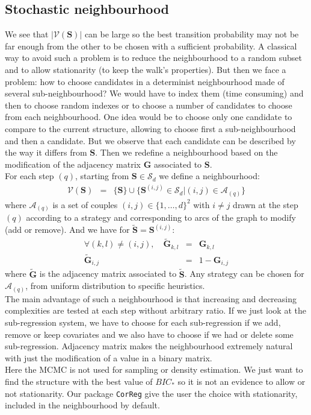 \documentclass[12pt,a4paper]{report}
\begin{document}
	\subsection{Stochastic neighbourhood}
	We see that $|\mathcal{V}(\boldsymbol{S})|$ can be large so the best transition probability may not be far enough from the other to be chosen with a sufficient probability. A classical way to avoid such a problem is to reduce the neighbourhood to a random subset and to allow stationarity (to keep the walk's properties). But then we face a problem: how to choose candidates in a determinist neighbourhood made of several sub-neighbourhood? We would have to index them (time consuming) and then to choose random indexes or to choose a number of candidates to choose from each neighbourhood. One idea would be to choose only one candidate to compare to the current structure, allowing to choose first a sub-neighbourhood and then a candidate. But we observe that each candidate can be described by the way it differs from $\boldsymbol{S}$. Then we redefine a neighbourhood based on the modification of the adjacency matrix $\boldsymbol{G}$ associated to $\boldsymbol{S}$.\\
	
	For each step $(q)$, starting from $\boldsymbol{S} \in \mathcal{S}_d$ we define a neighbourhood:
		\begin{eqnarray}
		\mathcal{V}(\boldsymbol{S})&=& \{\boldsymbol{S} \}\cup \{ \boldsymbol{S}^{(i,j)} \in \mathcal{S}_d|(i,j) \in \mathcal{A}_{(q)}\} 
	\end{eqnarray}	
	where $\mathcal{A}_{(q)}$ is a set of couples $(i,j) \in \{1,\dots,d \}^2$ with $i\neq j$ drawn at the step $(q)$ according to a strategy and corresponding to arcs of the graph to modify (add or remove).
	And we have for  $\tilde{\boldsymbol{S}}=\boldsymbol{S}^{(i,j)}$:
	\begin{eqnarray}
		\forall (k,l)\neq (i,j), \quad	\tilde{\boldsymbol{G}}_{k,l}&=&\boldsymbol{G}_{k,l} \\
		\tilde{\boldsymbol{G}}_{i,j}&=&1-\boldsymbol{G}_{i,j} 
	\end{eqnarray}
	where $\tilde{\boldsymbol{G}}$ is the adjacency matrix associated to $\tilde{\boldsymbol{S}}$. Any strategy can be chosen for $\mathcal{A}_{(q)}$, from uniform distribution to specific heuristics.\\
	
The main advantage of such a neighbourhood is that increasing and decreasing complexities are tested at each step without arbitrary ratio. If we just look at the sub-regression system, we have to choose for each sub-regression if we add, remove or keep covariates and we also have to choose if we had or delete some sub-regression. Adjacency matrix makes the neighbourhood extremely natural with just the modification of a value in a binary matrix. \\
Here the MCMC is not used for sampling or density estimation. We just want to find the structure with the best value of $BIC_*$ so it is not an evidence to allow or not stationarity. Our package {\tt CorReg} give the user the choice with stationarity,  included in the neighbourhood by default.
\end{document}

